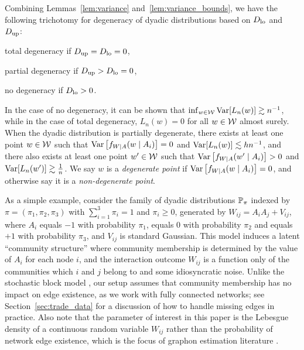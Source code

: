 Combining Lemmas~\ref{lem:variance} and~\ref{lem:variance_bounds},
we have the following trichotomy
for degeneracy of dyadic distributions
based on $\Dl$ and $\Du$:
%
\begin{inlineroman}
\item
  total degeneracy if $\Du = \Dl = 0$,
\item
  partial degeneracy if $\Du > \Dl = 0$,
\item
  no degeneracy if $\Dl > 0$.
\end{inlineroman}
%
In the case of no degeneracy,
it can be shown that
$\inf_{w \in \cW} \Var[L_n(w)] \gtrsim n^{-1}$,
while in the case of total degeneracy,
$L_n(w) = 0$ for all $w \in \cW$ almost surely.
When the dyadic distribution is partially degenerate,
there exists at least one point
$w\in\cW$ such that
$\Var\left[f_{W \mid A}(w \mid A_i)\right] = 0$
and $\Var[L_n(w)]\lesssim h n^{-1}$,
and there also exists at least one point
$w'\in \cW$ such that
$\Var\left[f_{W \mid A}(w' \mid A_i)\right] > 0$ and
$\Var[L_n(w')] \gtrsim \frac{1}{n}$.
We say $w$ is a \emph{degenerate point}
if $\Var\left[f_{W \mid A}(w \mid A_i)\right] = 0$,
and otherwise say it is a
\emph{non-degenerate point}.

As a simple example,
consider the family of dyadic distributions $\P_{\pi}$
indexed by $\pi = (\pi_1, \pi_2, \pi_3)$
with $\sum_{i=1}^3 \pi_i = 1$ and $\pi_i \geq 0$,
generated by $W_{i j} = A_i A_j + V_{i j}$,
where $A_i$ equals $-1$ with probability $\pi_1$,
equals $0$ with probability $\pi_2$
and equals $+1$ with probability $\pi_3$,
and $V_{i j}$ is standard Gaussian.
This model induces a latent
``community structure'' where community membership
is determined by the value of $A_i$ for each node $i$,
and the interaction outcome $W_{i j}$ is a function
only of the communities which $i$ and $j$ belong to and some
idiosyncratic noise.
Unlike the stochastic block model
\citep{kolaczyk2009statistical},
our setup assumes that
community membership has no impact on edge existence,
as we work with fully connected networks;
see Section~\ref{sec:trade_data} for a discussion of
how to handle missing edges in practice.
Also note that the parameter of interest in this paper is the Lebesgue density
of a continuous random variable $W_{i j}$
rather than the probability of network edge existence,
which is the focus of graphon estimation
literature \citep{gao2021minimax}.

